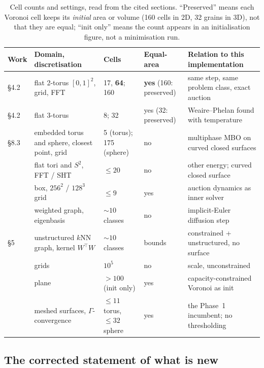\documentclass[11pt,a4paper]{article}
\begin{document}
\begin{table}[H]
\centering\footnotesize
\begin{tabular}{@{}p{2.5cm}p{3.5cm}p{1.9cm}p{1.9cm}p{4.4cm}@{}}
\toprule
Work & Domain, discretisation & Cells & Equal-area & Relation to this implementation \\
\midrule
\cite{jacobs2018auction} \S4.2 & flat 2-torus $[0,1]^2$, grid, FFT & 17, \textbf{64}; 160 & \textbf{yes} (160: preserved) & same step, same problem class, exact auction \\
\cite{jacobs2018auction} \S4.2 & flat 3-torus & 8; 32 & yes (32: preserved) & Weaire--Phelan found with temperature \\
\cite{merriman2007surfaces} \S8.3 & embedded torus and sphere, closest point, grid & 5 (torus); 175 (sphere) & no & multiphase MBO on curved closed surfaces \\
\cite{wang2019dirichlet} & flat tori and $S^2$, FFT / SHT & $\le 20$ & no & other energy; curved closed surface \\
\cite{hu2024iterative} & box, $256^2$ / $128^3$ grid & $\le 9$ & yes & auction dynamics as inner solver \\
\cite{garcia2014multiclass} & weighted graph, eigenbasis & $\sim 10$ classes & no & implicit-Euler diffusion step \\
\cite{jacobs2018auction} \S5 & unstructured $k$NN graph, kernel $W^\top W$ & $\sim 10$ classes & bounds & constrained + unstructured, no surface \\
\cite{elsey2009grain, elsey2011large} & grids & $10^5$ & no & scale, unconstrained \\
\cite{bogosel2021longest} & plane & $> 100$ (init only) & yes & capacity-constrained Voronoi as init \\
\cite{bogosel2017partitions} & meshed surfaces, $\Gamma$-convergence & $\le 11$ torus, $\le 32$ sphere & yes & the Phase~1 incumbent; no thresholding \\
\bottomrule
\end{tabular}
\caption{Cell counts and settings, read from the cited sections.
``Preserved'' means each Voronoi cell keeps its \emph{initial} area or volume
(160 cells in 2D, 32 grains in 3D), not that they are equal; ``init only''
means the count appears in an initialisation figure, not a minimisation run.}
\label{tab:lineage}
\end{table}

\subsection{The corrected statement of what is new}
\label{sec:novelty}
\end{document}
